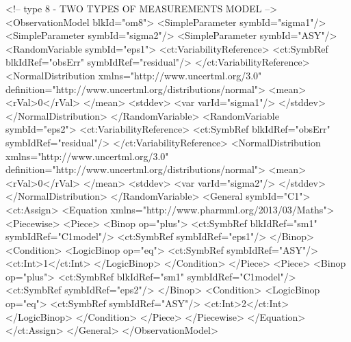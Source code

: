 \documentclass[a4paper,10pt]{article}
\begin{document}
\begin{xmlcode}
<!-- type 8 - TWO TYPES OF MEASUREMENTS MODEL -->
<ObservationModel blkId="om8">
    <SimpleParameter symbId="sigma1"/>
    <SimpleParameter symbId="sigma2"/>
    <SimpleParameter symbId="ASY"/>
    <RandomVariable symbId="eps1">
        <ct:VariabilityReference>
            <ct:SymbRef blkIdRef="obsErr" symbIdRef="residual"/>
        </ct:VariabilityReference>
        <NormalDistribution xmlns="http://www.uncertml.org/3.0" definition="http://www.uncertml.org/distributions/normal">
            <mean>
                <rVal>0</rVal>
            </mean>
            <stddev>
                <var varId="sigma1"/>
            </stddev>
        </NormalDistribution>
    </RandomVariable>
    <RandomVariable symbId="eps2">
        <ct:VariabilityReference>
            <ct:SymbRef blkIdRef="obsErr" symbIdRef="residual"/>
        </ct:VariabilityReference>
        <NormalDistribution xmlns="http://www.uncertml.org/3.0" definition="http://www.uncertml.org/distributions/normal">
            <mean>
                <rVal>0</rVal> 
            </mean>
            <stddev>
                <var varId="sigma2"/>
            </stddev>
        </NormalDistribution>
    </RandomVariable>
    <General symbId="C1">
        <ct:Assign>
            <Equation xmlns="http://www.pharmml.org/2013/03/Maths">
                <Piecewise>
                    <Piece>
                        <Binop op="plus">
                            <ct:SymbRef blkIdRef="sm1" symbIdRef="C1model"/>
                            <ct:SymbRef symbIdRef="eps1"/>
                        </Binop>
                        <Condition>
                            <LogicBinop op="eq">
                                <ct:SymbRef symbIdRef="ASY"/>
                                <ct:Int>1</ct:Int>
                            </LogicBinop>
                        </Condition>
                    </Piece>
                    <Piece>
                        <Binop op="plus">
                            <ct:SymbRef blkIdRef="sm1" symbIdRef="C1model"/>
                            <ct:SymbRef symbIdRef="eps2"/>
                        </Binop>
                        <Condition>
                            <LogicBinop op="eq">
                                <ct:SymbRef symbIdRef="ASY"/>
                                <ct:Int>2</ct:Int>
                            </LogicBinop>
                        </Condition>                                        
                    </Piece>
                </Piecewise>
            </Equation>
        </ct:Assign>
    </General>
</ObservationModel> 
\end{xmlcode}
\end{document}
